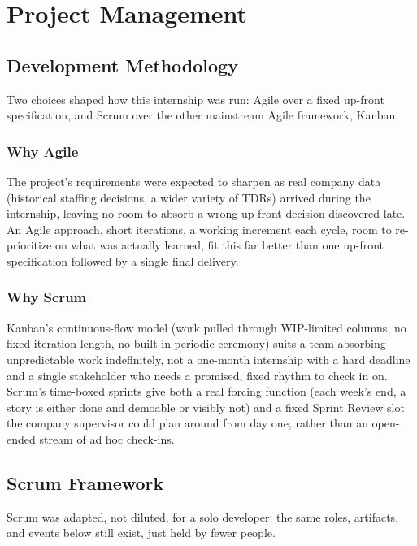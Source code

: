 \chapter{Project Management}
\label{chap:project-management}
\enlargethispage{4\baselineskip}

\section{Development Methodology}

Two choices shaped how this internship was run: Agile over a fixed
up-front specification, and Scrum over the other mainstream Agile
framework, Kanban.

\subsection{Why Agile}

The project's requirements were expected to sharpen as real company data
(historical staffing decisions, a wider variety of TDRs) arrived during
the internship, leaving no room to absorb a wrong up-front decision
discovered late. An Agile approach, short iterations, a working
increment each cycle, room to re-prioritize on what was actually
learned, fit this far better than one up-front specification followed by
a single final delivery.

\subsection{Why Scrum}

Kanban's continuous-flow model (work pulled through WIP-limited columns,
no fixed iteration length, no built-in periodic ceremony) suits a team
absorbing unpredictable work indefinitely, not a one-month internship
with a hard deadline and a single stakeholder who needs a promised,
fixed rhythm to check in on. Scrum's time-boxed sprints give both a real
forcing function (each week's end, a story is either done and demoable
or visibly not) and a fixed Sprint Review slot the company supervisor
could plan around from day one, rather than an open-ended stream of ad
hoc check-ins.

\section{Scrum Framework}

Scrum was adapted, not diluted, for a solo developer: the same roles,
artifacts, and events below still exist, just held by fewer people.

